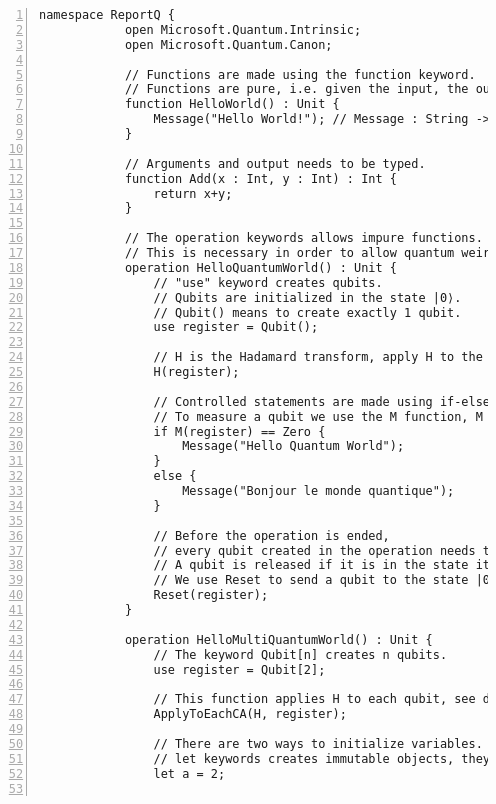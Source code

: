 \documentclass[
10pt, %
a4  paper, %
twoside, %
headinclude,footinclude, %
BCOR=5mm, %
]{scrartcl}
\begin{document}
    \begin{Verbatim}[gobble=2, numbers=left, frame=lines,
        framesep=3mm,
        label={[Beginning of code]End of code}]
        namespace ReportQ {
            open Microsoft.Quantum.Intrinsic;
            open Microsoft.Quantum.Canon;

            // Functions are made using the function keyword.
            // Functions are pure, i.e. given the input, the output should always be the same.
            function HelloWorld() : Unit {
                Message("Hello World!"); // Message : String -> Unit
            }

            // Arguments and output needs to be typed.
            function Add(x : Int, y : Int) : Int {
                return x+y;
            }

            // The operation keywords allows impure functions.
            // This is necessary in order to allow quantum weirdness.
            operation HelloQuantumWorld() : Unit {
                // "use" keyword creates qubits.
                // Qubits are initialized in the state |0⟩.
                // Qubit() means to create exactly 1 qubit.
                use register = Qubit();

                // H is the Hadamard transform, apply H to the register
                H(register);

                // Controlled statements are made using if-else
                // To measure a qubit we use the M function, M : Qubit -> Result.
                if M(register) == Zero {
                    Message("Hello Quantum World");
                }
                else {
                    Message("Bonjour le monde quantique");
                }

                // Before the operation is ended, 
                // every qubit created in the operation needs to be released.
                // A qubit is released if it is in the state it was initialized in.
                // We use Reset to send a qubit to the state |0⟩.
                Reset(register);
            }

            operation HelloMultiQuantumWorld() : Unit {
                // The keyword Qubit[n] creates n qubits.
                use register = Qubit[2];

                // This function applies H to each qubit, see documentation for more info.
                ApplyToEachCA(H, register);

                // There are two ways to initialize variables.
                // let keywords creates immutable objects, they may not be changed.
                let a = 2;


\end{Verbatim}
\end{document}
